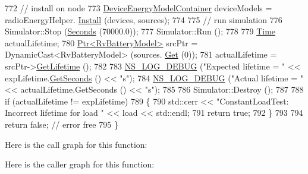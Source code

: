 \begin{DoxyCode}
772   \textcolor{comment}{// install on node}
773   \hyperlink{classns3_1_1DeviceEnergyModelContainer}{DeviceEnergyModelContainer} deviceModels = radioEnergyHelper.
      \hyperlink{classns3_1_1DeviceEnergyModelHelper_a085a4854e96ff8f314a9ebec93e6c4eb}{Install} (devices, sources);
774 
775   \textcolor{comment}{// run simulation}
776   Simulator::Stop (\hyperlink{group__timecivil_ga33c34b816f8ff6628e33d5c8e9713b9e}{Seconds} (70000.0));
777   Simulator::Run ();
778 
779   \hyperlink{classns3_1_1Time}{Time} actualLifetime;
780   \hyperlink{classns3_1_1Ptr}{Ptr<RvBatteryModel>} srcPtr = DynamicCast<RvBatteryModel> (sources.
      \hyperlink{classns3_1_1EnergySourceContainer_ac59e8c3dc22ecb142f3398dcd23c5c37}{Get} (0));
781   actualLifetime = srcPtr->\hyperlink{classns3_1_1RvBatteryModel_a0195713aa6eeb966f3189192b5fbeea1}{GetLifetime} ();
782 
783   \hyperlink{group__logging_ga413f1886406d49f59a6a0a89b77b4d0a}{NS\_LOG\_DEBUG} (\textcolor{stringliteral}{"Expected lifetime = "} << expLifetime.\hyperlink{classns3_1_1Time_a8f20d5c3b0902d7b4320982f340b57c8}{GetSeconds} () << \textcolor{stringliteral}{"s"});
784   \hyperlink{group__logging_ga413f1886406d49f59a6a0a89b77b4d0a}{NS\_LOG\_DEBUG} (\textcolor{stringliteral}{"Actual lifetime = "} << actualLifetime.GetSeconds () << \textcolor{stringliteral}{"s"});
785 
786   Simulator::Destroy ();
787 
788   \textcolor{keywordflow}{if} (actualLifetime != expLifetime)
789     \{
790       std::cerr << \textcolor{stringliteral}{"ConstantLoadTest: Incorrect lifetime for load "} << load << std::endl;
791       \textcolor{keywordflow}{return} \textcolor{keyword}{true};
792     \}
793 
794   \textcolor{keywordflow}{return} \textcolor{keyword}{false}; \textcolor{comment}{// error free}
795 \}
\end{DoxyCode}


Here is the call graph for this function\+:




Here is the caller graph for this function\+:


